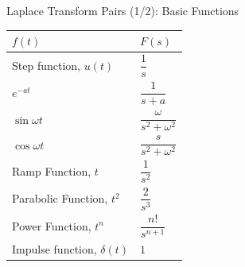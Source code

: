 \documentclass[12pt, aspectratio=169]{beamer}
\begin{document}


\begin{frame}{Laplace Transform Pairs (1/2): Basic Functions}
    \begin{center}
        \scriptsize
        \setlength{\tabcolsep}{2em}
        \renewcommand{\arraystretch}{1.9}
        \begin{tabular}{@{}ll@{}}
            \toprule
            $f(t)$ & $F(s)$ \\
            \midrule
            Step function, $u(t)$        & $\dfrac{1}{s}$ \\
            $e^{-at}$                    & $\dfrac{1}{s+a}$ \\
            $\sin \omega t$              & $\dfrac{\omega}{s^2+\omega^2}$ \\
            $\cos \omega t$              & $\dfrac{s}{s^2+\omega^2}$ \\
            Ramp Function, $t$           & $\dfrac{1}{s^2}$ \\
            Parabolic Function, $t^2$    & $\dfrac{2}{s^3}$ \\
            Power Function, $t^n$        & $\dfrac{n!}{s^{n+1}}$ \\
            Impulse function, $\delta(t)$ & $1$ \\
            \bottomrule
        \end{tabular}
    \end{center}
\end{frame}

\end{document}
